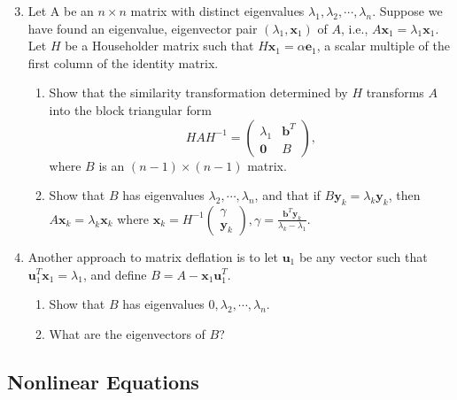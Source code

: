 \documentclass{article}
\renewcommand{\vec}[1]{\mathbf{#1}}
\begin{document}
\begin{enumerate}
\setcounter{enumi}{2}
\item Let A be an $n \times n$ matrix with distinct eigenvalues $\lambda_1, \lambda_2, \cdots, \lambda_n$.
Suppose we have found an eigenvalue, eigenvector pair $(\lambda_1,\vec{x}_1)$ of $A$, i.e., $A \vec{x}_1 = \lambda_1 \vec{x}_1$.  Let $H$ be a Householder matrix such that $H\vec{x}_1 =
\alpha \vec{e}_1$, a scalar multiple of the first column of the identity  matrix.  
\begin{enumerate}
\item Show that the similarity transformation determined by $H$ transforms $A$ into the block triangular form 
$$
H A H^{-1} = \begin{pmatrix} \lambda_1 & \vec{b}^T \\ \vec{0} & B \end{pmatrix},
$$
where $B$ is an $(n-1) \times (n-1)$ matrix.
\item Show that $B$ has eigenvalues $\lambda_2, \cdots, \lambda_n$, and that if $B\vec{y}_k = \lambda_k \vec{y}_k$, then $A \vec{x}_k = \lambda_k \vec{x}_k$ where $\vec{x}_k =
  H^{-1} \begin{pmatrix} \gamma \\ \vec{y}_k \end{pmatrix}, \gamma = \frac{\vec{b}^T\vec{y}_k}{\lambda_k-\lambda_1}.$
\end{enumerate}
\item Another approach to matrix deflation is to let $\vec{u}_1$ be any vector such that $\vec{u}_1^T\vec{x}_1 = \lambda_1$, and define $B = A - \vec{x}_1\vec{u}_1^T$.
\begin{enumerate}
\item Show that $B$ has eigenvalues $0, \lambda_2, \cdots, \lambda_n$.
\item What are the eigenvectors of $B$?
\end{enumerate}

\end{enumerate}

\subsection*{Nonlinear Equations}
\end{document}
